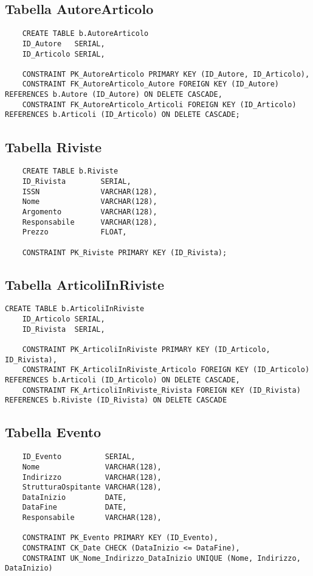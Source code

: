 \subsection{Tabella AutoreArticolo}
\begin{lstlisting}
    CREATE TABLE b.AutoreArticolo
    ID_Autore   SERIAL,
    ID_Articolo SERIAL,

    CONSTRAINT PK_AutoreArticolo PRIMARY KEY (ID_Autore, ID_Articolo),
    CONSTRAINT FK_AutoreArticolo_Autore FOREIGN KEY (ID_Autore) REFERENCES b.Autore (ID_Autore) ON DELETE CASCADE,
    CONSTRAINT FK_AutoreArticolo_Articoli FOREIGN KEY (ID_Articolo) REFERENCES b.Articoli (ID_Articolo) ON DELETE CASCADE;
\end{lstlisting}

\subsection{Tabella Riviste}
\begin{lstlisting}
    CREATE TABLE b.Riviste
    ID_Rivista        SERIAL,
    ISSN              VARCHAR(128),
    Nome              VARCHAR(128),
    Argomento         VARCHAR(128),
    Responsabile      VARCHAR(128),
    Prezzo            FLOAT,

    CONSTRAINT PK_Riviste PRIMARY KEY (ID_Rivista);
\end{lstlisting}

\subsection{Tabella ArticoliInRiviste}
\begin{lstlisting}
CREATE TABLE b.ArticoliInRiviste
    ID_Articolo SERIAL,
    ID_Rivista  SERIAL,

    CONSTRAINT PK_ArticoliInRiviste PRIMARY KEY (ID_Articolo, ID_Rivista),
    CONSTRAINT FK_ArticoliInRiviste_Articolo FOREIGN KEY (ID_Articolo) REFERENCES b.Articoli (ID_Articolo) ON DELETE CASCADE,
    CONSTRAINT FK_ArticoliInRiviste_Rivista FOREIGN KEY (ID_Rivista) REFERENCES b.Riviste (ID_Rivista) ON DELETE CASCADE
\end{lstlisting}

\newpage

\subsection{Tabella Evento}
\begin{lstlisting}
    ID_Evento          SERIAL,
    Nome               VARCHAR(128),
    Indirizzo          VARCHAR(128),
    StrutturaOspitante VARCHAR(128),
    DataInizio         DATE,
    DataFine           DATE,
    Responsabile       VARCHAR(128),

    CONSTRAINT PK_Evento PRIMARY KEY (ID_Evento),
    CONSTRAINT CK_Date CHECK (DataInizio <= DataFine),
    CONSTRAINT UK_Nome_Indirizzo_DataInizio UNIQUE (Nome, Indirizzo, DataInizio)
\end{lstlisting}

